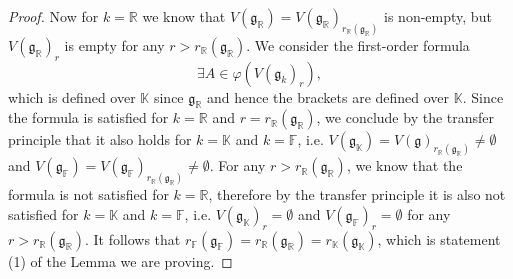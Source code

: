 \documentclass[12pt]{amsart}
\newcommand{\F}{\mathbb{F} }
\newcommand{\R}{\mathbb{R} }
\newcommand{\K}{\mathbb{K}}
\newcommand{\frakg}{\mathfrak{g}}
\numberwithin{equation}{section}
\theoremstyle{remark} %
\begin{document}
\begin{proof}
	
	Now for $k = \R$ we know that $V(\frakg_\R) = V(\frakg_\R)_{r_\R(\frakg_\R)}$ is non-empty, but $V(\frakg_\R)_{r}$ is empty for any $r > r_\R(\frakg_\R)$. We consider the first-order formula
	$$
	\exists A \in  \varphi( V(\frakg_k)_r ),
	$$
	which is defined over $\K$ since $\frakg_\R$ and hence the brackets are defined over $\K$. Since the formula is satisfied for $k=\R$ and $r=r_\R(\frakg_\R)$, we conclude by the transfer principle that it also holds for $k=\K$ and $k=\F$, i.e. $V(\frakg_\K) = V(\frakg)_{r_\R(\frakg_\R)} \neq \emptyset$ and $V(\frakg_\F) = V(\frakg_\F)_{r_\R(\frakg_\R)} \neq \emptyset$. For any $r > r_\R(\frakg_\R)$, we know that the formula is not satisfied for $k=\R$, therefore by the transfer principle it is also not satisfied for $k=\K$ and $k=\F$, i.e. $V(\frakg_\K)_{r} = \emptyset$ and $V(\frakg_\F)_{r} = \emptyset$ for any  $r > r_\R(\frakg_\R)$. It follows that $r_\F(\frakg_\F) = r_\R(\frakg_\R) = r_\K (\frakg_\K)$, which is statement (1) of the Lemma we are proving.
	

\end{proof}
\end{document}
